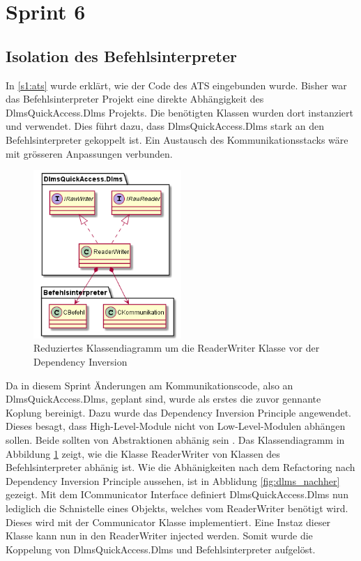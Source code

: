 \section{Sprint 6}

\subsection{Isolation des Befehlsinterpreter}
In \ref{s1:ats} wurde erklärt, wie der Code des \ac{ATS} eingebunden wurde.
Bisher war das Befehlsinterpreter Projekt eine direkte Abhängigkeit des DlmsQuickAccess.Dlms Projekts.
Die benötigten Klassen wurden dort instanziert und verwendet. 
Dies führt dazu, dass DlmsQuickAccess.Dlms stark an den Befehlsinterpreter gekoppelt ist.
Ein Austausch des Kommunikationsstacks wäre mit grösseren Anpassungen verbunden.


\begin{figure}[H]
   \centering
   \includegraphics[width=0.5\textwidth]{gfx/dlms_vorher.png}
   \caption{
      Reduziertes Klassendiagramm um die ReaderWriter Klasse vor der Dependency Inversion
   }
   \label{fig:dlms_vorher}
\end{figure}

Da in diesem Sprint Änderungen am Kommunikationscode, also an DlmsQuickAccess.Dlms, geplant sind, wurde als erstes die zuvor gennante Koplung bereinigt.
Dazu wurde das Dependency Inversion Principle angewendet.
Dieses besagt, dass High-Level-Module nicht von Low-Level-Modulen abhängen sollen.
Beide sollten von Abstraktionen abhänig sein \parencite{madasu35solid}.
Das Klassendiagramm in Abbildung \ref{fig:dlms_vorher} zeigt, wie die Klasse ReaderWriter von Klassen des Befehlsinterpreter abhänig ist.
Wie die Abhänigkeiten nach dem Refactoring nach Dependency Inversion Principle aussehen, ist in Abblidung \ref{fig:dlms_nachher} gezeigt.
Mit dem ICommunicator Interface definiert DlmsQuickAccess.Dlms nun lediglich die Schnistelle eines Objekts, welches vom ReaderWriter benötigt wird.
Dieses wird mit der Communicator Klasse implementiert. Eine Instaz dieser Klasse kann nun in den ReaderWriter injected werden.
Somit wurde die Koppelung von DlmsQuickAccess.Dlms und Befehlsinterpreter aufgelöst.

